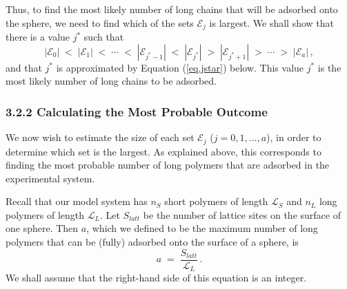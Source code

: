 \documentclass[journal=mamobx,manuscript=article]{achemso}
\newcommand{\leng}{\mathcal{L}}
\begin{document}
Thus, to find the most likely number of long chains %
that will be adsorbed onto the sphere, we need to 
find which of the sets $\mathcal{E}_j$ is largest.
We shall show that there is a value $j^*$
such that 
\begin{equation}
    \label{eq.EEcomp}
  |\mathcal{E}_0| \;<\; |\mathcal{E}_1|\; < \; 
 \cdots\; < \; 
  |\mathcal{E}_{j^*-1}|\; < \;|\mathcal{E}_{j^*}|\; >
    \; |\mathcal{E}_{j^*+1}| \;>\; \cdots \; > \; |\mathcal{E}_a|\,,
\end{equation}
and that $j^*$ is approximated by Equation (\ref{eq.jstar}) below.  
This value $j^*$ is the most likely
number of long chains to be adsorbed.

\subsubsection{3.2.2 Calculating the Most Probable Outcome}
We now wish to estimate the size of each set $\mathcal{E}_j$ ($j=0,1,\ldots,a$), in order to  determine which set is the largest.  
As explained above, this corresponds to finding the most probable number of 
long polymers that are adsorbed in the experimental system. 

Recall that our model system has $n_S$ short 
polymers of length $\leng_S$ and $n_L$ long polymers
of length $\leng_L$.  
Let $S_{latt}$ be the number of lattice sites on 
the surface of one sphere.  Then $a$, which we
defined to be the maximum
number of long polymers that can be (fully)
adsorbed onto the surface of a sphere, is 
\begin{equation}
  \label{eq.aequal}
     a  \;=\;  \frac{S_{latt}}{\leng_L} \,.
\end{equation}
We shall assume that the right-hand side of this equation is an integer.  
\end{document}
